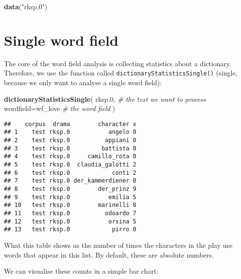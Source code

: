 \documentclass[]{book}
\newenvironment{Shaded}{\begin{snugshade}}{\end{snugshade}}
\newcommand{\CommentTok}[1]{\textcolor[rgb]{0.56,0.35,0.01}{\textit{#1}}}
\newcommand{\DataTypeTok}[1]{\textcolor[rgb]{0.13,0.29,0.53}{#1}}
\newcommand{\FloatTok}[1]{\textcolor[rgb]{0.00,0.00,0.81}{#1}}
\newcommand{\KeywordTok}[1]{\textcolor[rgb]{0.13,0.29,0.53}{\textbf{#1}}}
\newcommand{\NormalTok}[1]{#1}
\newcommand{\StringTok}[1]{\textcolor[rgb]{0.31,0.60,0.02}{#1}}
\begin{document}
\begin{Shaded}
\begin{Highlighting}[]
\KeywordTok{data}\NormalTok{(}\StringTok{"rksp.0"}\NormalTok{)}
\end{Highlighting}
\end{Shaded}

\hypertarget{single-word-field}{%
\section{Single word field}\label{single-word-field}}

The core of the word field analysis is collecting statistics about a dictionary. Therefore, we use the function called \texttt{dictionaryStatisticsSingle()} (single, because we only want to analyse a single word field):

\begin{Shaded}
\begin{Highlighting}[]
\KeywordTok{dictionaryStatisticsSingle}\NormalTok{(}
\NormalTok{  rksp}\FloatTok{.0}\NormalTok{,              }\CommentTok{# the text we want to process}
  \DataTypeTok{wordfield=}\NormalTok{wf_love    }\CommentTok{# the word field}
\NormalTok{)}
\end{Highlighting}
\end{Shaded}

\begin{verbatim}
##    corpus  drama        character x
## 1    test rksp.0           angelo 0
## 2    test rksp.0          appiani 0
## 3    test rksp.0         battista 0
## 4    test rksp.0     camillo_rota 0
## 5    test rksp.0  claudia_galotti 2
## 6    test rksp.0            conti 2
## 7    test rksp.0 der_kammerdiener 0
## 8    test rksp.0        der_prinz 9
## 9    test rksp.0           emilia 5
## 10   test rksp.0        marinelli 8
## 11   test rksp.0          odoardo 7
## 12   test rksp.0           orsina 5
## 13   test rksp.0            pirro 0
\end{verbatim}

What this table shows us the number of times the characters in the play use words that appear in this list. By default, these are absolute numbers.

We can visualise these counts in a simple bar chart:
\end{document}
